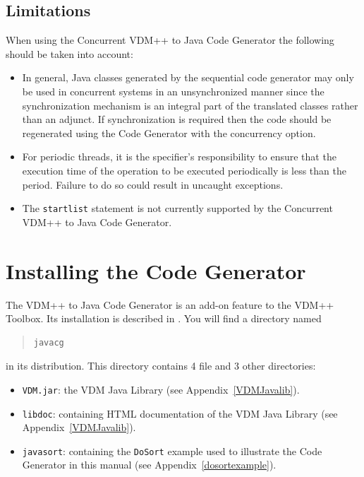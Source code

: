 \documentclass[\pformat,11pt]{article}
\newcommand{\tcg}{the Code Generator}
\newcommand{\cg}{VDM++ to Java Code Generator}
\newcommand{\ccg}{Concurrent \cg}
\newcommand{\JL}{VDM Java Library}
\begin{document}
\subsection{Limitations}
When using the \ccg{} the following should be taken into account:
\begin{itemize}
\item In general, Java classes generated by the sequential code generator
may only be used in concurrent systems in an unsynchronized manner
since the synchronization mechanism is an integral part of the
translated classes rather than an adjunct. If synchronization is
required then the code should be regenerated using \tcg{} with the
concurrency option.

\item For periodic threads, it is the specifier's responsibility to ensure
that the execution time of the operation to be executed periodically
is less than the period. Failure to do so could result in uncaught
exceptions.

\item The \texttt{startlist} statement is not currently supported by the
\ccg. 
\end{itemize}


\appendix


\newpage



\newpage
\section{Installing the Code Generator}
\label{install}

The \cg{} is an add-on feature to the VDM++ Toolbox. Its installation is
described in \cite{InstallPPMan-SCSK}. You will find a directory named

\begin{quote}
\begin{verbatim}
javacg
\end{verbatim}
\end{quote}

in its distribution. This directory contains 4 file and 3 other directories:

\begin{itemize}
\item {\tt VDM.jar}: the \JL{} (see Appendix~\ref{VDMJavalib}).
\item {\tt libdoc}: containing HTML documentation of the \JL{} (see Appendix~\ref{VDMJavalib}).
\item {\tt javasort}: containing the \texttt{DoSort} example used to illustrate the Code Generator in this manual (see Appendix~\ref{dosortexample}).
\end{itemize}
\end{document}

